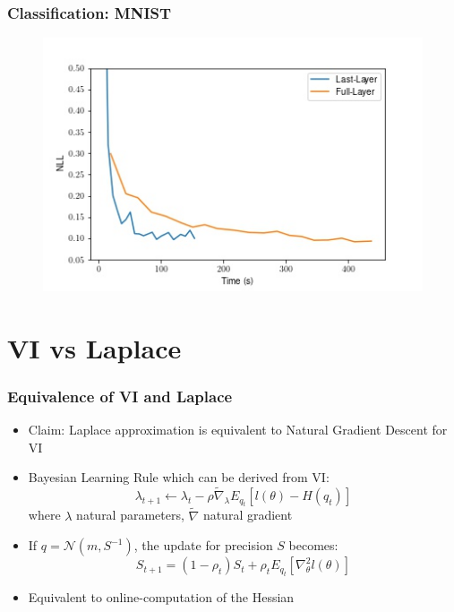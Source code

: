\documentclass{beamer}
\begin{document}
        \begin{frame}
            \frametitle{Classification: MNIST}
            \begin{figure}
                \includegraphics[width=\textwidth]{images/Classification/LLvsFull.jpg}
            \end{figure}
        \end{frame}


        \section{VI vs Laplace}

        \begin{frame}
            \frametitle{Equivalence of VI and Laplace}
            \begin{itemize}
                \item Claim: Laplace approximation is equivalent to Natural Gradient Descent for VI
                \item Bayesian Learning Rule which can be derived from VI:     
                    \begin{equation}
                        \lambda_{t+1} \leftarrow \lambda_{t} - \rho \tilde{\nabla}_\lambda E_{q_t}[l(\theta) - H(q_t)]
                    \end{equation}
                    where $\lambda$ natural parameters, $\tilde{\nabla}$ natural gradient
                \item If $q = \mathcal{N}(m, S^{-1})$, the update for precision $S$ becomes:
                    \begin{equation}
                        S_{t+1} = (1 - \rho_t) S_t + \rho_t E_{q_t}[\nabla^2_\theta l(\theta)]
                    \end{equation}
                \item Equivalent to online-computation of the Hessian
            \end{itemize}
        \end{frame}
\end{document}
